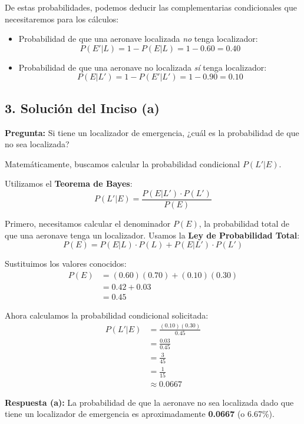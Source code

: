 \documentclass[a4paper]{article}
\begin{document}
De estas probabilidades, podemos deducir las complementarias condicionales que necesitaremos para los cálculos:
\begin{itemize}
    \item Probabilidad de que una aeronave localizada \textit{no} tenga localizador:
    $$ P(E' | L) = 1 - P(E | L) = 1 - 0.60 = 0.40 $$
    \item Probabilidad de que una aeronave no localizada \textit{sí} tenga localizador:
    $$ P(E | L') = 1 - P(E' | L') = 1 - 0.90 = 0.10 $$
\end{itemize}

\subsection*{3. Solución del Inciso (a)}

\textbf{Pregunta:} Si tiene un localizador de emergencia, ¿cuál es la probabilidad de que no sea localizada?

Matemáticamente, buscamos calcular la probabilidad condicional $P(L' | E)$.

Utilizamos el \textbf{Teorema de Bayes}:
$$ P(L' | E) = \frac{P(E | L') \cdot P(L')}{P(E)} $$

Primero, necesitamos calcular el denominador $P(E)$, la probabilidad total de que una aeronave tenga un localizador. Usamos la \textbf{Ley de Probabilidad Total}:
$$ P(E) = P(E | L) \cdot P(L) + P(E | L') \cdot P(L') $$

Sustituimos los valores conocidos:
\begin{align*}
    P(E) &= (0.60)(0.70) + (0.10)(0.30) \\
    &= 0.42 + 0.03 \\
    &= 0.45
\end{align*}

Ahora calculamos la probabilidad condicional solicitada:
\begin{align*}
    P(L' | E) &= \frac{(0.10)(0.30)}{0.45} \\
    &= \frac{0.03}{0.45} \\
    &= \frac{3}{45} \\
    &= \frac{1}{15} \\
    &\approx 0.0667
\end{align*}

\textbf{Respuesta (a):} La probabilidad de que la aeronave no sea localizada dado que tiene un localizador de emergencia es aproximadamente \textbf{0.0667} (o 6.67\%).

\vspace{0.5cm}
\end{document}
